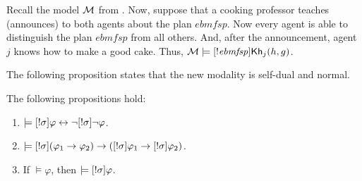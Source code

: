 \begin{example}\label{ex:sref}
Recall the model $\mathcal{M}$ from .
Now, suppose that a cooking professor teaches (announces) to both agents about the plan $\mathit{ebmfsp}$.
Now every agent is able to distinguish the plan $\mathit{ebmfsp}$ from all others.
And, after the announcement, agent~$j$ knows how to make a good cake.
Thus, $\mathcal{M} \models [!\mathit{ebmfsp}] {\sf Kh}_j(h,g)$.
\end{example}

\medskip

The following proposition states that the new modality is self-dual and normal.

\medskip 

\begin{proposition}
The following propositions hold:
\begin{enumerate}
\item $\models [!\sigma]\varphi \leftrightarrow \neg[!\sigma]\neg\varphi$. 
\item $\models [!\sigma](\varphi_1 \rightarrow \varphi_2) \rightarrow ([!\sigma]\varphi_1 \rightarrow [!\sigma]\varphi_2)$.
\item If $\models \varphi$, then $\models [!\sigma]\varphi$.
\end{enumerate}
\end{proposition}

\medskip 


